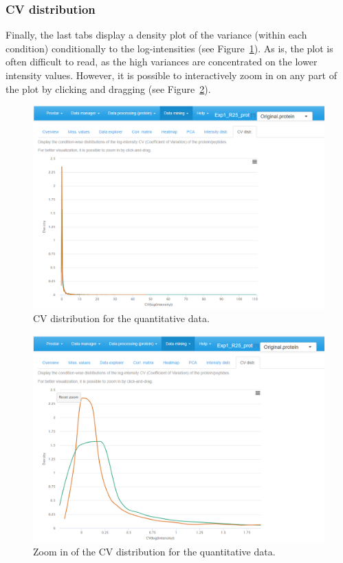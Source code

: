 \documentclass[12pt]{article}
\begin{document}

\subsubsection{CV distribution}

Finally, the last tabs display a density plot of the variance (within each condition) conditionally to the log-intensities  (see Figure~\ref{fig:sdvdZoomOut}).
As is, the plot is often difficult to read, as the high variances are concentrated on the lower intensity values. 
However, it is possible to interactively zoom in on any part of the plot by clicking and dragging (see Figure~\ref{fig:sdvdZoomIn}).

\begin {figure}
\includegraphics[width=\textwidth]{images/desc_CVDist_ZoomOut.png}
\caption{CV distribution for the quantitative data.}\label{fig:sdvdZoomOut}
\end {figure}

\begin {figure}
\includegraphics[width=\textwidth]{images/desc_CVDist_ZoomIn.png}
\caption{Zoom in of the CV distribution for the quantitative data.}\label{fig:sdvdZoomIn}
\end {figure}
\end{document}
